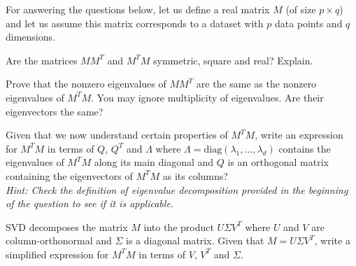 For answering the questions below, let us define a real matrix $M$ (of size $p \times q$) and let us assume this matrix corresponds to a dataset with $p$ data points and $q$ dimensions. 

Are the matrices $M M^T$ and $M^T M$ symmetric, square and real? Explain.

Prove that the nonzero eigenvalues of $M M^T$ are the same as the nonzero eigenvalues of $M^T M$. You may ignore multiplicity of eigenvalues. Are their eigenvectors the same? 

Given that we now understand certain properties of $M^T M$, write an expression for $M^T M$ in terms of $Q$, $Q^T$ and $\Lambda$ where $\Lambda = \text{diag}(\lambda_1, \dots, \lambda_d)$ contains the eigenvalues of $M^T M$ along its main diagonal and $Q$ is an orthogonal matrix containing the eigenvectors of $M^T M$ as its columns?\\
\textit{Hint: Check the definition of eigenvalue decomposition provided in the beginning of the question to see if it is applicable.}


SVD decomposes the matrix $M$ into the product $U \Sigma V^T$ where $U$ and $V$ are column-orthonormal and $\Sigma$ is a diagonal matrix. Given that $M = U \Sigma V^T$, write a simplified expression for $M^T M$ in terms of $V$, $V^T$ and $\Sigma$.

